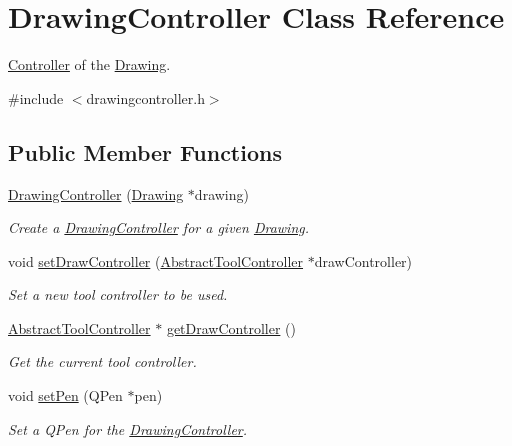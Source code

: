 \hypertarget{classDrawingController}{}\section{Drawing\+Controller Class Reference}
\label{classDrawingController}


\hyperlink{classController}{Controller} of the \hyperlink{classDrawing}{Drawing}.  




{\ttfamily \#include $<$drawingcontroller.\+h$>$}

\subsection*{Public Member Functions}
\begin{DoxyCompactItemize}
\item 
\hyperlink{classDrawingController_a91a1fbfc4bbe11e56765f648dc3dc40e}{Drawing\+Controller} (\hyperlink{classDrawing}{Drawing} $\ast$drawing)
\begin{DoxyCompactList}\small\item\em Create a \hyperlink{classDrawingController}{Drawing\+Controller} for a given \hyperlink{classDrawing}{Drawing}. \end{DoxyCompactList}\item 
void \hyperlink{classDrawingController_a384807cfdf6c25495d5a894dfd91631b}{set\+Draw\+Controller} (\hyperlink{classAbstractToolController}{Abstract\+Tool\+Controller} $\ast$draw\+Controller)
\begin{DoxyCompactList}\small\item\em Set a new tool controller to be used. \end{DoxyCompactList}\item 
\hyperlink{classAbstractToolController}{Abstract\+Tool\+Controller} $\ast$ \hyperlink{classDrawingController_a5bb04261355c2d5bd5be402bc1f633fb}{get\+Draw\+Controller} ()
\begin{DoxyCompactList}\small\item\em Get the current tool controller. \end{DoxyCompactList}\item 
void \hyperlink{classDrawingController_ac2148fc6b277b02463690683f6241288}{set\+Pen} (Q\+Pen $\ast$pen)
\begin{DoxyCompactList}\small\item\em Set a Q\+Pen for the \hyperlink{classDrawingController}{Drawing\+Controller}. \end{DoxyCompactList}\item 

\end{DoxyCompactItemize}
